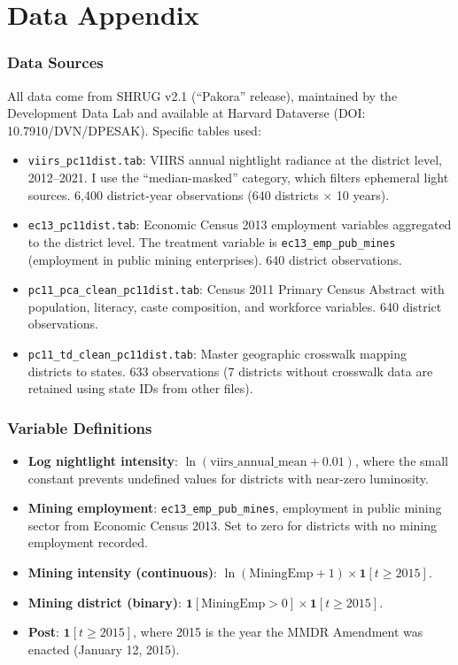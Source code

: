 \documentclass[12pt]{article}
\begin{document}
\newpage
\appendix

\section{Data Appendix}

\subsubsection*{Data Sources} All data come from SHRUG v2.1 (``Pakora'' release), maintained by the Development Data Lab \citep{asher2021development} and available at Harvard Dataverse (DOI: 10.7910/DVN/DPESAK). Specific tables used:

\begin{itemize}
  \item \texttt{viirs\_pc11dist.tab}: VIIRS annual nightlight radiance at the district level, 2012--2021. I use the ``median-masked'' category, which filters ephemeral light sources. 6,400 district-year observations (640 districts $\times$ 10 years).
  \item \texttt{ec13\_pc11dist.tab}: Economic Census 2013 employment variables aggregated to the district level. The treatment variable is \texttt{ec13\_emp\_pub\_mines} (employment in public mining enterprises). 640 district observations.
  \item \texttt{pc11\_pca\_clean\_pc11dist.tab}: Census 2011 Primary Census Abstract with population, literacy, caste composition, and workforce variables. 640 district observations.
  \item \texttt{pc11\_td\_clean\_pc11dist.tab}: Master geographic crosswalk mapping districts to states. 633 observations (7 districts without crosswalk data are retained using state IDs from other files).
\end{itemize}

\subsubsection*{Variable Definitions}
\begin{itemize}
  \item \textbf{Log nightlight intensity}: $\ln(\text{viirs\_annual\_mean} + 0.01)$, where the small constant prevents undefined values for districts with near-zero luminosity.
  \item \textbf{Mining employment}: \texttt{ec13\_emp\_pub\_mines}, employment in public mining sector from Economic Census 2013. Set to zero for districts with no mining employment recorded.
  \item \textbf{Mining intensity (continuous)}: $\ln(\text{MiningEmp} + 1) \times \mathbf{1}[t \geq 2015]$.
  \item \textbf{Mining district (binary)}: $\mathbf{1}[\text{MiningEmp} > 0] \times \mathbf{1}[t \geq 2015]$.
  \item \textbf{Post}: $\mathbf{1}[t \geq 2015]$, where 2015 is the year the MMDR Amendment was enacted (January 12, 2015).
\end{itemize}
\end{document}
